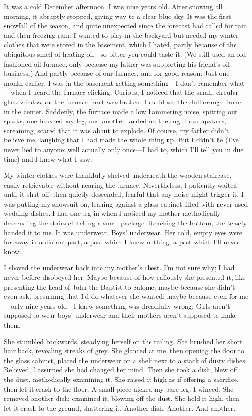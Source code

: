 It was a cold December afternoon. I was nine years old. After snowing
all morning, it abruptly stopped, giving way to a clear blue sky. It was
the first snowfall of the season, and quite unexpected since the
forecast had called for rain and then freezing rain. I wanted to play in
the backyard but needed my winter clothes that were stored in the
basement, which I hated, partly because of the ubiquitous smell of
heating oil---so bitter you could taste it. (We still used an
old-fashioned oil furnace, only because my father was supporting his
friend's oil business.) And partly because of our furnace, and for good
reason: Just one month earlier, I was in the basement getting
something---I don't remember what---when I heard the furnace clicking.
Curious, I noticed that the small, circular glass window on the furnace
front was broken. I could see the dull orange flame in the center.
Suddenly, the furnace made a low hammering noise, spitting out sparks;
one brushed my leg, and another landed on the rug. I ran upstairs,
screaming, scared that it was about to explode. Of course, my father
didn't believe me, laughing that I had made the whole thing up. But I
didn't lie (I've never lied to anyone; well actually only once---I had
to, which I'll tell you in due time) and I know what I saw.

My winter clothes were thankfully shelved underneath the wooden
staircase, easily retrievable without nearing the furnace. Nevertheless,
I patiently waited until it shut off, then quietly descended, fearful
that any noise might trigger it. I was putting my snowsuit on, leaning
against a glass cabinet filled with never-used wedding dishes. I had one
leg in when I noticed my mother methodically descending the stairs
clutching a small package. Reaching the bottom, she tersely handed it to
me. It was underwear. Boys' underwear. Her cold, empty eyes were far
away in a distant past, a past which I knew nothing; a past which I'll
never know.

I shoved the underwear back into my mother's chest. I'm not sure why; I
had never before disobeyed her. Maybe because of how callously she
presented it, like presenting the head of John the Baptist to Salome;
maybe because she didn't even ask, presuming that I'd do whatever she
wanted; maybe because even for me---only nine years old---I knew
something was dreadfully wrong: Girls aren't supposed to wear boys'
underwear and their mothers aren't supposed to make them.

She stumbled backwards, steadying herself on the railing. She brushed
her short hair back, revealing streaks of grey. She glanced at me, then
opening the door to the glass cabinet, placed the underwear on a shelf
next to a stack of dusty dishes. Relieved, I assumed she had changed her
mind. Then she took a dish, blew off the dust, methodically examining
it. She raised it high as if offering a sacrifice, then let it crash to
the floor. A small piece nicked my bare leg. I winced. She removed
another dish; examined it, blowing off the dust. She held it high, then
let it crash to the ground, shattering it. Another dish. Another. And
another.

